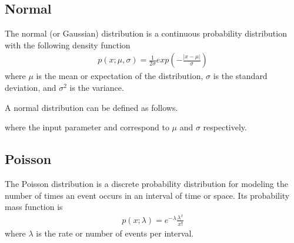 \documentclass[letterpaper,10pt,english]{sphinxmanual}
\begin{document}
\begin{sphinxVerbatim}[commandchars=\\\{\}]
  
    \PYG{p}{[} \PYG{p}{]}
    \PYG{p}{[} \PYG{p}{]}
\end{sphinxVerbatim}


\subsection{Normal}
\label{\detokenize{notes/guidemodels:normal}}
The normal (or Gaussian) distribution is a continuous probability distribution with the following density function
\begin{equation*}
\begin{split}p(x;\mu,\sigma) = \frac{1}{2\sigma} exp \left( - \frac{|x - \mu |}{\sigma}\right)\end{split}
\end{equation*}
where \(\mu\)  is the mean or expectation of the distribution, \(\sigma\)  is the standard deviation, and \(\sigma^{2}\) is the variance.

A normal distribution can be defined as follows.

\begin{sphinxVerbatim}[commandchars=\\\{\}]
   


  
\end{sphinxVerbatim}

where the input parameter  and  correspond to \(\mu\) and \(\sigma\) respectively.


\subsection{Poisson}
\label{\detokenize{notes/guidemodels:poisson}}
The Poisson distribution is a discrete probability distribution for modeling the number of times an event occurs
in an interval of time or space. Its probability mass function is
\begin{equation*}
\begin{split}p(x;\lambda) = e^{- \lambda} \frac{\lambda^x}{x!}\end{split}
\end{equation*}
where \(\lambda\) is the rate or number of events per interval.
\end{document}
